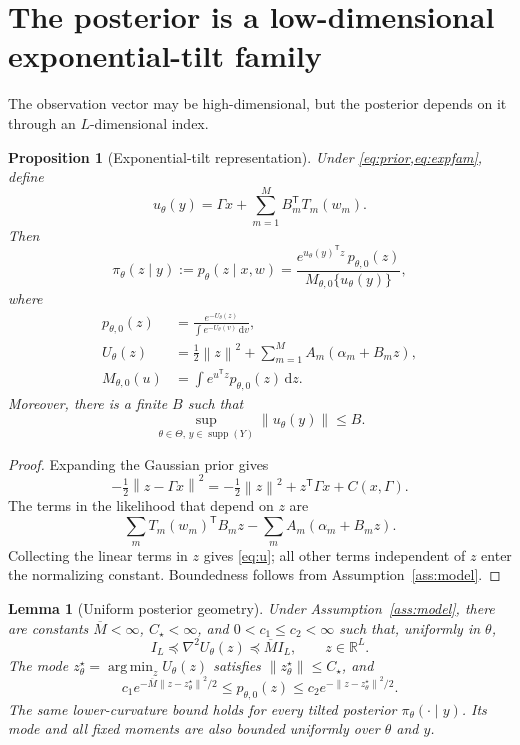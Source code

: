 \documentclass[11pt]{article}
\newtheorem{proposition}[theorem]{Proposition}
\newtheorem{lemma}[theorem]{Lemma}
\theoremstyle{definition}
\newcommand{\R}{\mathbb R}
\newcommand{\argmin}{\operatorname*{arg\,min}}
\newcommand{\dd}{\,\mathrm d}
\newcommand{\trans}{\mathsf T}
\newcommand{\norm}[1]{\left\lVert #1\right\rVert}
\begin{document}
\section{The posterior is a low-dimensional exponential-tilt family}
\label{sec:tilt}

The observation vector may be high-dimensional, but the posterior depends on it through an $L$-dimensional index.

\begin{proposition}[Exponential-tilt representation]
\label{prop:tilt}
Under \cref{eq:prior,eq:expfam}, define
\begin{equation}
u_\theta(y)
=
\Gamma x+\sum_{m=1}^M B_m^{\trans}T_m(w_m).
\label{eq:u}
\end{equation}
Then
\begin{equation}
\pi_\theta(z\mid y)
:=p_\theta(z\mid x,w)
=
\frac{e^{u_\theta(y)^{\trans}z}\,p_{\theta,0}(z)}
{M_{\theta,0}\{u_\theta(y)\}},
\label{eq:posterior-tilt}
\end{equation}
where
\begin{align}
p_{\theta,0}(z)
&=
\frac{e^{-U_\theta(z)}}{\int e^{-U_\theta(v)}\dd v},
\label{eq:base-density}\\
U_\theta(z)
&=
\frac12\norm{z}^2
+\sum_{m=1}^M A_m(\alpha_m+B_m z),
\label{eq:base-potential}\\
M_{\theta,0}(u)
&=
\int e^{u^{\trans}z}p_{\theta,0}(z)\dd z.
\end{align}
Moreover, there is a finite $B$ such that
\[
\sup_{\theta\in\Theta,\,y\in\operatorname{supp}(Y)}
\norm{u_\theta(y)}\le B.
\]
\end{proposition}

\begin{proof}
Expanding the Gaussian prior gives
\[
-\tfrac12\norm{z-\Gamma x}^2
=
-\tfrac12\norm z^2+z^{\trans}\Gamma x+C(x,\Gamma).
\]
The terms in the likelihood that depend on $z$ are
\[
\sum_m T_m(w_m)^{\trans}B_mz
-
\sum_m A_m(\alpha_m+B_mz).
\]
Collecting the linear terms in $z$ gives \cref{eq:u}; all other terms independent of $z$ enter the normalizing constant. Boundedness follows from Assumption~\ref{ass:model}.
\end{proof}

\begin{lemma}[Uniform posterior geometry]
\label{lem:geometry}
Under Assumption~\ref{ass:model}, there are constants $\overline M<\infty$, $C_\star<\infty$, and $0<c_1\le c_2<\infty$ such that, uniformly in $\theta$,
\begin{equation}
I_L\preceq \nabla^2 U_\theta(z)\preceq \overline M I_L,
\qquad z\in\R^L.
\label{eq:curvature}
\end{equation}
The mode $z_\theta^\star=\argmin_z U_\theta(z)$ satisfies $\norm{z_\theta^\star}\le C_\star$, and
\begin{equation}
c_1e^{-\overline M\norm{z-z_\theta^\star}^2/2}
\le p_{\theta,0}(z)
\le c_2e^{-\norm{z-z_\theta^\star}^2/2}.
\label{eq:gaussian-envelope}
\end{equation}
The same lower-curvature bound holds for every tilted posterior $\pi_\theta(\cdot\mid y)$. Its mode and all fixed moments are also bounded uniformly over $\theta$ and $y$.
\end{lemma}
\end{document}
